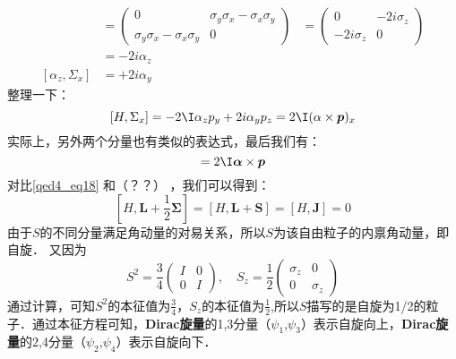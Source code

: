 \begin{align}
& = \left(\begin{array}{ccc}
0 & \sigma_{y} \sigma_{x}-\sigma_{x} \sigma_{y} \\
\sigma_{y} \sigma_{x}-\sigma_{x} \sigma_{y} & 0
\end{array}\right) & = \left(\begin{array}{cc}
0 & -2 i \sigma_{z} \\
-2 i \sigma_{z} & 0
\end{array}\right) \\ & = -2 i \alpha_{z} \\
\left[\alpha_{z}, \Sigma_{x}\right] & = +2 i \alpha_{y}
\end{align}
整理一下：
\begin{equation}
\left[H, \Sigma_{x}\right]=-2  \I \alpha_{z} p_{y}+2 i \alpha_{y} p_{z}=2  \I(\alpha \times \boldsymbol{p})_{x}
\end{equation}
实际上，另外两个分量也有类似的表达式，最后我们有：
\begin{equation}
[H, \mathbf{\Sigma}]=2  \I \boldsymbol{\alpha} \times \boldsymbol{p}
\end{equation}
对比\autoref{qed4_eq18} 和（？？）%
，我们可以得到：
\begin{equation}
\left[H, \boldsymbol{L}+\frac{1}{2} \boldsymbol{\Sigma}\right]=[H, \boldsymbol{L}+\boldsymbol{S}]=[H, \boldsymbol{J}]=0
\end{equation}
由于$S$的不同分量满足角动量的对易关系，所以$S$为该自由粒子的内禀角动量，即自旋．
又因为
\begin{equation}
S^{2}=\frac{3}{4}\left(\begin{array}{ll}
I & 0 \\
0 & I
\end{array}\right), \quad S_{z}=\frac{1}{2}\left(\begin{array}{cc}
\sigma_{z} & 0 \\
0 & \sigma_{z}
\end{array}\right)
\end{equation}
通过计算，可知$S^2$的本征值为$\frac{3}{4}$，$S_{z}$的本征值为$\frac{1}{2}$,所以$S$描写的是自旋为1/2的粒子．通过本征方程可知，\textbf{Dirac旋量}的1,3分量（$\psi_1$,$\psi_3$）表示自旋向上，\textbf{Dirac旋量}的2,4分量（$\psi_2$,$\psi_4$）表示自旋向下．

